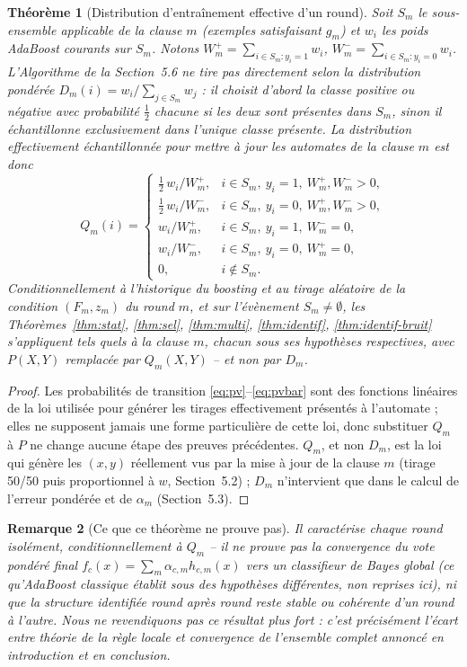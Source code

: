 \documentclass[12pt,a4paper]{article}
\newtheorem{theorem}{Théorème}
\newtheorem{remark}[theorem]{Remarque}
\begin{document}
\begin{theorem}[Distribution d'entraînement effective d'un round]\label{thm:boosting}
Soit $S_m$ le sous-ensemble applicable de la clause $m$ (exemples
satisfaisant $g_m$) et $w_i$ les poids AdaBoost courants sur $S_m$.
Notons $W_m^+=\sum_{i\in S_m:y_i=1}w_i$, $W_m^-=\sum_{i\in S_m:y_i=0}w_i$.
L'Algorithme de la Section~5.6 ne tire \emph{pas} directement selon la
distribution pondérée $D_m(i)=w_i/\sum_{j\in S_m}w_j$ : il choisit d'abord
la classe positive ou négative avec probabilité $\tfrac12$ chacune si les
deux sont présentes dans $S_m$, sinon il échantillonne exclusivement dans
l'unique classe présente. La distribution effectivement échantillonnée
pour mettre à jour les automates de la clause $m$ est donc
\[
  Q_m(i) = \begin{cases}
    \tfrac12\,w_i/W_m^+, & i\in S_m,\ y_i{=}1,\ W_m^+,W_m^->0,\\
    \tfrac12\,w_i/W_m^-, & i\in S_m,\ y_i{=}0,\ W_m^+,W_m^->0,\\
    w_i/W_m^+, & i\in S_m,\ y_i{=}1,\ W_m^-=0,\\
    w_i/W_m^-, & i\in S_m,\ y_i{=}0,\ W_m^+=0,\\
    0, & i\notin S_m.
  \end{cases}
\]
Conditionnellement à l'historique du boosting et au tirage aléatoire de la
condition $(F_m,z_m)$ du round $m$, et sur l'évènement $S_m\ne\emptyset$,
les Théorèmes~\ref{thm:stat}, \ref{thm:sel}, \ref{thm:multi},
\ref{thm:identif}, \ref{thm:identif-bruit} s'appliquent \emph{tels quels} à
la clause $m$, chacun sous ses hypothèses respectives, avec $P(X,Y)$
remplacée par $Q_m(X,Y)$ -- \emph{et non} par $D_m$.
\end{theorem}

\begin{proof}
Les probabilités de transition \eqref{eq:pv}--\eqref{eq:pvbar} sont des
fonctions linéaires de la loi utilisée pour générer les tirages
effectivement présentés à l'automate ; elles ne supposent jamais une forme
particulière de cette loi, donc substituer $Q_m$ à $P$ ne change aucune
étape des preuves précédentes. $Q_m$, et non $D_m$, est la loi qui génère
les $(x,y)$ réellement vus par la mise à jour de la clause $m$ (tirage
50/50 puis proportionnel à $w$, Section~5.2) ; $D_m$ n'intervient que dans
le calcul de l'erreur pondérée et de $\alpha_m$ (Section~5.3).
\end{proof}

\begin{remark}[Ce que ce théorème ne prouve pas]
Il caractérise chaque round \emph{isolément}, conditionnellement à $Q_m$ --
il ne prouve pas la convergence du vote pondéré final
$f_c(x)=\sum_m\alpha_{c,m}h_{c,m}(x)$ vers un classifieur de Bayes global
(ce qu'AdaBoost classique établit sous des hypothèses différentes, non
reprises ici), ni que la structure identifiée round après round reste
stable ou cohérente d'un round à l'autre. Nous ne revendiquons pas ce
résultat plus fort : c'est précisément l'écart entre théorie de la règle
locale et convergence de l'ensemble complet annoncé en introduction et en
conclusion.
\end{remark}
\end{document}
